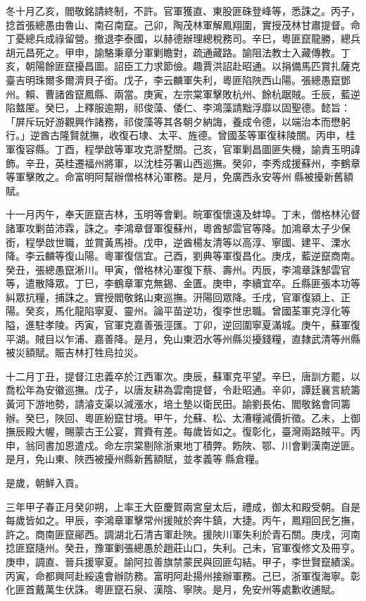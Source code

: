 \begin{pinyinscope}
冬十月乙亥，閻敬銘請終制，不許。官軍獲直、東股匪硃登峰等，悉誅之。丙子，捻首張總愚由魯山、南召南竄。己卯，陶茂林軍解鳳翔圍，實授茂林甘肅提督。命丁憂總兵成祿留營。撤退李泰國，以赫德辦理總稅務司。辛巳，粵匪竄龍勝，總兵胡元昌死之。甲申，諭駱秉章分軍剿瞻對，疏通藏路。諭阻法教士入藏傳教。丁亥，朝陽餘匪竄擾昌圖。詔臣工力求節儉。趣賈洪詔赴昭通。以捐備馬匹賞扎薩克臺吉明珠爾多爾濟貝子銜。戊子，李云麟軍失利，粵匪陷陜西山陽。張總愚竄鄧州。賴、曹諸酋竄鳳縣、兩當。庚寅，左宗棠軍擊敗杭州、餘杭踞賊。壬辰，藍逆陷盩厔。癸巳，上釋服逾期，祁俊藻、倭仁、李鴻藻請黜浮靡以固聖德。懿旨：「屏斥玩好游觀興作諸務，祁俊藻等其各朝夕納誨，養成令德，以端治本而懋躬行。」逆酋古隆賢就撫，收復石埭、太平、旌德。曾國荃等軍復秣陵關。丙申，桂軍復容縣。丁酉，程學啟等軍攻克滸墅關。己亥，官軍剿昌圖匪失機，諭責玉明諱飾。辛丑，英桂遷福州將軍，以沈桂芬署山西巡撫。癸卯，李秀成援蘇州，李鶴章等軍擊敗之。命富明阿幫辦僧格林沁軍務。是月，免廣西永安等州縣被擾新舊額賦。

十一月丙午，奉天匪竄吉林，玉明等會剿。皖軍復懷遠及蚌埠。丁未，僧格林沁督諸軍攻剿苗沛霖，誅之。李鴻章督軍復蘇州，粵酋郜雲官等降。加鴻章太子少保銜，程學啟世職，並賞黃馬褂。戊申，逆酋楊友清等以高淳、寧國、建平、溧水降。李云麟等復山陽。粵軍復信宜。己酉，劉典等軍復昌化。庚戌，藍逆竄商南。癸丑，張總愚竄淅川。甲寅，僧格林沁軍復下蔡、壽州。丙辰，李鴻章誅郜雲官等，遣散降眾。丁巳，李鶴章軍克無錫、金匱。庚申，李續宜卒。丘縣匪張本功等糾眾抗糧，捕誅之。實授閻敬銘山東巡撫。汧陽回眾降。壬戌，官軍復潁上、正陽。癸亥，馬化龍陷寧夏、靈州。論平苗逆功，復李世忠職。曾國荃軍克淳化等隘，進駐孝陵。丙寅，官軍克嘉善張涇匯。丁卯，逆回圍寧夏滿城。庚午，蘇軍復平湖。賊目以乍浦、嘉善降。是月，免山東泗水等州縣災擾錢糧，直隸武清等州縣被災額賦。賑吉林打牲烏拉災。

十二月丁丑，提督江忠義卒於江西軍次。庚辰，蘇軍克平望。辛巳，唐訓方罷，以喬松年為安徽巡撫。戊子，以唐友耕為雲南提督，令赴昭通。辛卯，譚廷襄言統籌黃河下游地勢，請濬支渠以減漲水，培土墊以衛民田。諭劉長佑、閻敬銘會同籌辦。癸巳，陜回、粵匪紛竄甘境。甲午，允蘇、松、太漕糧減價折徵。乙未，上御撫辰殿大幄，賜蒙古王公宴，賞賚有差。每歲皆如之。復彰化，臺灣兩路賊平。丙申，翁同書加恩遣戍。命左宗棠剔除浙東地丁積弊。飭陜、鄂、川會剿漢南逆匪。是月，免山東、陜西被擾州縣新舊額賦，並孝義等縣倉糧。

是歲，朝鮮入貢。

三年甲子春正月癸卯朔，上率王大臣慶賀兩宮皇太后，禮成，御太和殿受朝。自是每歲皆如之。甲辰，李鴻章軍擊常州援賊於奔牛鎮，大捷。丙午，鳳翔回民乞撫，許之。商南匪竄鄖西。調湖北石清吉軍赴陜。援陜川軍失利於青石關。庚戌，河南捻匪竄隨州。癸丑，豫軍剿張總愚於趙莊山口，失利。己未，官軍復修文及冊亨。庚申，調直、晉兵援寧夏。諭阿拉善旗禁蒙民與回匪勾結。甲子，李世賢竄績溪。丙寅，命都興阿赴綏遠會辦防務。富明阿赴揚州接辦軍務。己巳，浙軍復海寧。彰化匪首戴萬生伏誅。粵匪竄石泉、漢陰、寧陜。是月，免安州等處歉收逋賦。


\end{pinyinscope}
